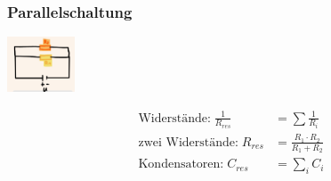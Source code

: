 \subsubsection*{Parallelschaltung}
\vspace{-1mm}
\begin{minipage}{0.39\linewidth}
    \begin{footnotesize}
        \begin{center}
            \vspace{2mm}
            \includegraphics[width = 20mm]{src/images/parallelschaltung.png}
        \end{center}
    \end{footnotesize}
\end{minipage}
\begin{minipage}{0.6\linewidth}
    \begin{scriptsize}
        \begin{center}
            \begin{align*}
                \text{Widerstände:} \; \frac{1}{R_{res}} &= \sum \frac{1}{R_i}\\
                \text{zwei Widerstände:} \; R_{res} &= \frac{R_1 \cdot R_2}{R_1 + R_2}\\
                \text{Kondensatoren:} \; C_{res} &= \sum\limits_i C_i
            \end{align*}
        \end{center}
    \end{scriptsize}
\end{minipage}